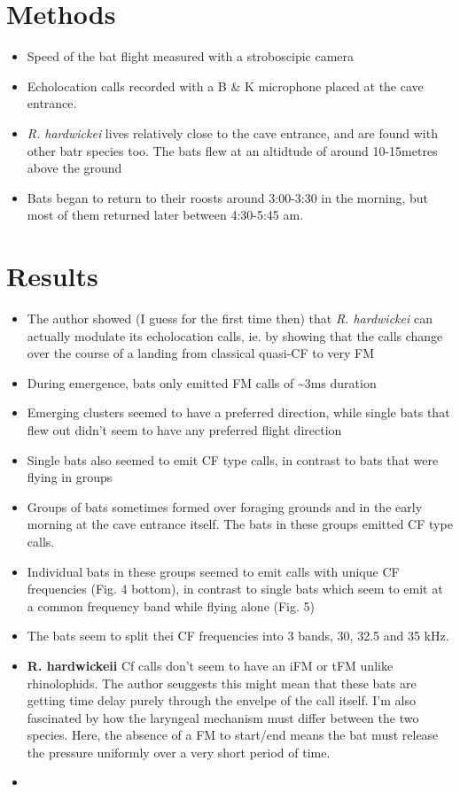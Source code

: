 \documentclass[
]{book}
\providecommand{\tightlist}{%
  \setlength{\itemsep}{0pt}\setlength{\parskip}{0pt}}
\begin{document}
\hypertarget{methods-4}{%
\section{Methods}\label{methods-4}}

\begin{itemize}
\tightlist
\item
  Speed of the bat flight measured with a stroboscipic camera
\item
  Echolocation calls recorded with a B \& K microphone placed at the cave entrance.
\item
  \emph{R. hardwickei} lives relatively close to the cave entrance, and are found with other batr species too. The bats flew at an altidtude of around 10-15metres above the ground
\item
  Bats began to return to their roosts around 3:00-3:30 in the morning, but most of them returned later between 4:30-5:45 am.
\end{itemize}

\hypertarget{results-4}{%
\section{Results}\label{results-4}}

\begin{itemize}
\item
  The author showed (I guess for the first time then) that \emph{R. hardwickei} can actually modulate its echolocation calls, ie. by showing that the calls change over the course of a landing from classical quasi-CF to very FM
\item
  During emergence, bats only emitted FM calls of \textasciitilde3ms duration
\item
  Emerging clusters seemed to have a preferred direction, while single bats that flew out didn't seem to have any preferred flight direction
\item
  Single bats also seemed to emit CF type calls, in contrast to bats that were flying in groups
\item
  Groups of bats sometimes formed over foraging grounds and in the early morning at the cave entrance itself. The bats in these groups emitted CF type calls.
\item
  Individual bats in these groups seemed to emit calls with unique CF frequencies (Fig. 4 bottom), in contrast to single bats which seem to emit at a common frequency band while flying alone (Fig. 5)
\item
  The bats seem to split thei CF frequencies into 3 bands, 30, 32.5 and 35 kHz.
\item
  \textbf{R. hardwickeii} Cf calls don't seem to have an iFM or tFM unlike rhinolophids. The author seuggests this might mean that these bats are getting time delay purely through the envelpe of the call itself. I'm also fascinated by how the laryngeal mechanism must differ between the two species. Here, the absence of a FM to start/end means the bat must release the pressure uniformly over a very short period of time.
\item
\end{itemize}
\end{document}
